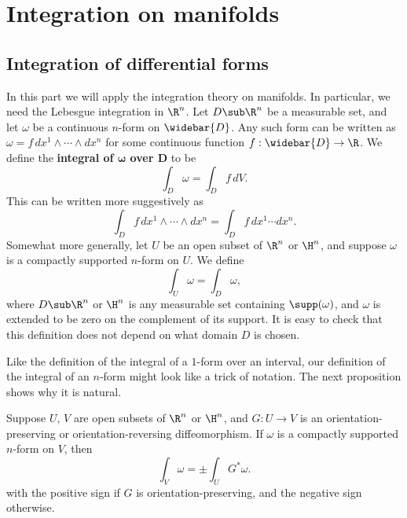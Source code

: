 \section{Integration on manifolds}
\subsection{Integration of differential forms}
In this part we will apply the integration theory on manifolds. In particular, we need the Lebesgue integration in $\R^n$. Let $D\sub\R^n$ be a measurable set, and let $\omega$ be a continuous $n$-form on $\widebar{D}$. Any such form can be written as $\omega=f\,dx^1\wedge\cdots\wedge dx^n$ for some continuous function $f:\widebar{D}\to\R$. We define the \textbf{integral of $\bm{\omega}$ over $\bm{D}$} to be
\[\int_D\omega=\int_Df\,dV.\]
This can be written more suggestively as
\[\int_Df\,dx^1\wedge\cdots\wedge dx^n=\int_Df\,dx^1\cdots dx^n.\]
Somewhat more generally, let $U$ be an open subset of $\R^n$ or $\H^n$, and suppose $\omega$ is a compactly supported $n$-form on $U$. We define
\[\int_U\omega=\int_D\omega,\]
where $D\sub\R^n$ or $\H^n$ is any measurable set containing $\supp(\omega)$, and $\omega$ is extended to be zero on the complement of its support. It is easy to check that this definition does not depend on what domain $D$ is chosen.\par
Like the definition of the integral of a $1$-form over an interval, our definition of the integral of an $n$-form might look like a trick of notation. The next proposition shows why it is natural.
\begin{proposition}\label{int R^n pull back}
Suppose $U$, $V$ are open subsets of $\R^n$ or $\H^n$, and $G:U\to V$ is an orientation-preserving or orientation-reversing diffeomorphism. If $\omega$ is a compactly supported $n$-form on $V$, then
\[\int_V\omega=\pm\int_UG^*\omega.\]
with the positive sign if $G$ is orientation-preserving, and the negative sign otherwise.
\end{proposition}
